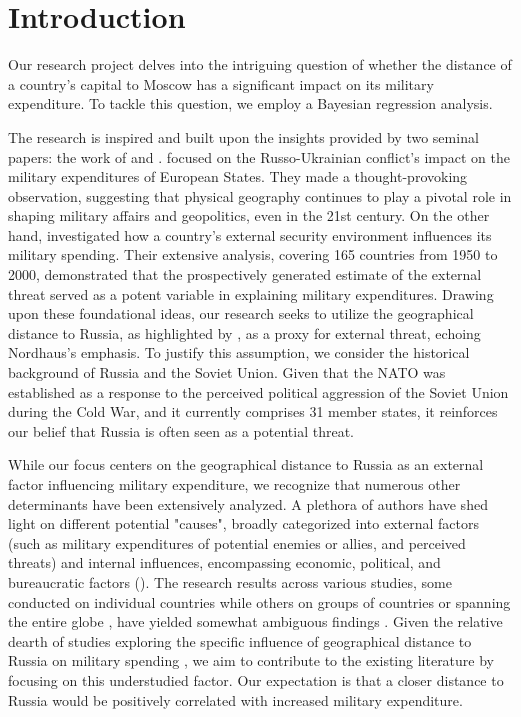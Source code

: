 \documentclass[12pt,a4paper]{article}
\begin{document}
\section{Introduction}

Our research project delves into the intriguing question of whether the distance of a country's capital to Moscow has a significant impact on its military expenditure. To tackle this question, we employ a Bayesian regression analysis.

The research is inspired and built upon the insights provided by two seminal papers: the work of \citet{kofrovn2023} and \citet{nordhaus2012}. \citet{kofrovn2023} focused on the Russo-Ukrainian conflict's impact on the military expenditures of European States. They made a thought-provoking observation, suggesting that physical geography continues to play a pivotal role in shaping military affairs and geopolitics, even in the 21st century. On the other hand, \citet{nordhaus2012} investigated how a country's external security environment influences its military spending. Their extensive analysis, covering 165 countries from 1950 to 2000, demonstrated that the prospectively generated estimate of the external threat served as a potent variable in explaining military expenditures. Drawing upon these foundational ideas, our research seeks to utilize the geographical distance to Russia, as highlighted by \citet{kofrovn2023}, as a proxy for external threat, echoing Nordhaus's emphasis. To justify this assumption, we consider the historical background of Russia and the Soviet Union. Given that the NATO was established as a response to the perceived political aggression of the Soviet Union during the Cold War, and it currently comprises 31 member states, it reinforces our belief that Russia is often seen as a potential threat.

While our focus centers on the geographical distance to Russia as an external factor influencing military expenditure, we recognize that numerous other determinants have been extensively analyzed. A plethora of authors have shed light on different potential "causes", broadly categorized into external factors (such as military expenditures of potential enemies or allies, and perceived threats) and internal influences, encompassing economic, political, and bureaucratic factors (\citet{nikolaidou2008}). The research results across various studies, some conducted on individual countries while others on groups of countries or spanning the entire globe \citep{nikolaidou2008,george2018,nordhaus2012}, have yielded somewhat ambiguous findings \citep{nikolaidou2008, odehnal2020}. 
Given the relative dearth of studies exploring the specific influence of geographical distance to Russia on military spending \citep{kofrovn2023}, we aim to contribute to the existing literature by focusing on this understudied factor. Our expectation is that a closer distance to Russia would be positively correlated with increased military expenditure.
\end{document}
